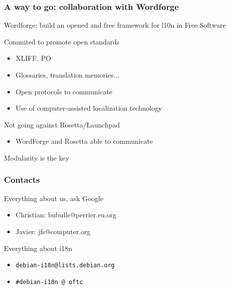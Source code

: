\documentclass{beamer}
\begin{document}
\begin{frame}
  \frametitle{A way to go: collaboration with Wordforge}
	\begin{block}
		{Wordforge: build an opened and free framework for l10n in Free Software}
	\end{block}
	\begin{block}
		{Commited to promote open standards}
	\begin{itemize}
	\item
		{XLIFF, PO}
	\item
		{Glossaries, translation memories...}
	\item
		{Open protocols to communicate}
	\item
		{Use of computer-assisted localization technology}
	\end{itemize}
	\end{block}
	\begin{block}
		{Not going against Rosetta/Launchpad}
	\begin{itemize}
	\item
		{WordForge and Rosetta able to communicate}
	\end{itemize}
	\end{block}
	\begin{block}
		{Modularity is the key}
	\end{block}
\end{frame}


\begin{frame}
  \frametitle{Contacts}
	\begin{block}
		{Everything about us, ask Google}
		\begin{itemize}
		\item
			{Christian: bubulle@perrier.eu.org}
		\item
			{Javier: jfs@computer.org}
		\end{itemize}
	\end{block}
	\begin{block}
		{Everything about i18n}
		\begin{itemize}
		\item
			{\texttt{debian-i18n@lists.debian.org}}
		\item
			{\texttt{\#debian-i18n @ oftc}}
		\end{itemize}
	\end{block}
\end{frame}
\end{document}
